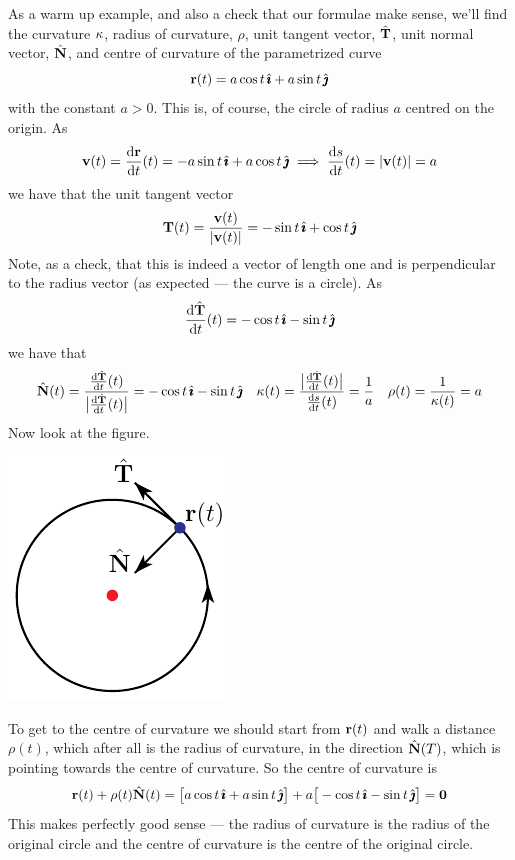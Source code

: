 \begin{eg}\label{eg:curveCircle}
As a warm up example, and also a check that our formulae make sense,
we'll find the curvature $\kappa$, radius of curvature, $\rho$, unit tangent
vector, $\hat{\mathbf{T}}$, unit normal vector, $\hat{\mathbf{N}}$, and centre of curvature 
of the parametrized curve
\begin{equation*}
\mathbf{r}(t) = a\cos t\,\hat{\pmb{\imath}} + a\sin t\,\hat{\pmb{\jmath}}
\end{equation*}
with the constant $a>0$.
This is, of course, the circle of radius $a$ centred on the origin.
As
\begin{equation*}
\vv(t)=\diff{\vr}{t}(t)= -a\sin t\,\hi + a\cos t\,\hj
\implies \diff{s}{t}(t) = |\vv(t)| = a
\end{equation*}
we have that the unit tangent vector
\begin{equation*}
\mathbf{T}(t) = \frac{\mathbf{v}(t)}{|\mathbf{v}(t)|} = -\sin t\,\hat{\pmb{\imath}} + \cos t\,\hat{\pmb{\jmath}}
\end{equation*}
Note, as a check, that this is indeed a vector of length one and
is perpendicular to the radius vector (as expected --- the curve is a circle).
As 
\begin{equation*}
\diff{\hat\vT}{t}(t)= -\cos t\,\hi  -\sin t\,\hj
\end{equation*}
we have that
\begin{equation*}
\hat\vN(t) = \frac{\diff{\hat\vT}{t}(t)}{\big|\diff{\hat\vT}{t}(t)\big|}
           = -\cos t\,\hi  -\sin t\,\hj
\quad
\ka(t) 
= \frac{\big|\diff{\hat\vT}{t}(t)\big|}{\diff{s}{t}(t)}
=\frac{1}{a}
\quad
\rho(t)=\frac{1}{\ka(t)} =a
\end{equation*}
Now look at the figure.
\begin{efig}
\begin{center}
     \includegraphics{circleCentreB.pdf}
\end{center}
\end{efig}
To get to the centre of curvature we should start from
$\mathbf{r}(t)$ and walk a distance $\rho(t)$, which after all is the radius
of curvature, in the direction $\hat{\mathbf{N}}(T)$, which is pointing towards the centre of curvature. So the centre of curvature is
\begin{equation*}
\mathbf{r}(t)+\rho(t)\hat{\mathbf{N}}(t) 
=\big[a\cos t\,\hat{\pmb{\imath}}  +a\sin t\,\hat{\pmb{\jmath}}\big]
+a\big[-\cos t\,\hat{\pmb{\imath}}  -\sin t\,\hat{\pmb{\jmath}}\big]
= \mathbf{0}
\end{equation*}
This makes perfectly good sense --- the radius of curvature is
the radius of the original circle and the centre of curvature is the
centre of the original circle.



\end{eg}
